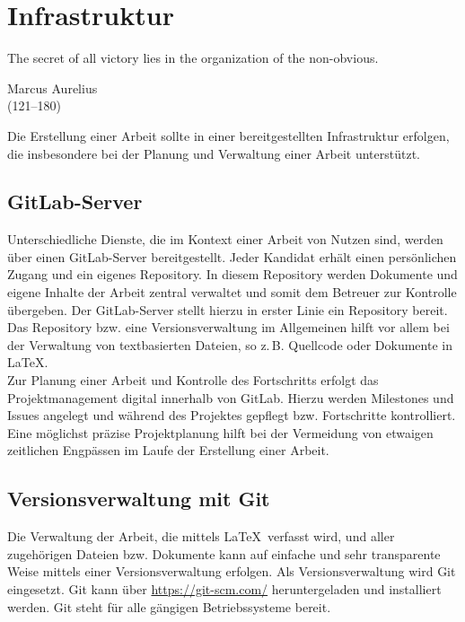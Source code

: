 \chapter{Infrastruktur}
\label{chap:infrastruktur}

\epigraph{\glqq The secret of all victory lies in the organization of the non-obvious.\grqq\bigskip}%
{{Marcus Aurelius}\\ (121--180)}

\noindent
Die Erstellung einer Arbeit sollte in einer bereitgestellten Infrastruktur erfolgen, die insbesondere bei der Planung und Verwaltung einer Arbeit unterstützt.
\indent

\section{GitLab-Server}

Unterschiedliche Dienste, die im Kontext einer Arbeit von Nutzen sind, werden über einen GitLab-Server bereitgestellt. Jeder Kandidat erhält einen persönlichen Zugang und ein eigenes Repository. In diesem Repository werden Dokumente und eigene Inhalte der Arbeit zentral verwaltet und somit dem Betreuer zur Kontrolle übergeben. Der GitLab-Server stellt hierzu in erster Linie ein Repository bereit. Das Repository bzw. eine Versionsverwaltung im Allgemeinen hilft vor allem bei der Verwaltung von textbasierten Dateien, so z.\,B. Quellcode oder Dokumente in \LaTeX .\\

Zur Planung einer Arbeit und Kontrolle des Fortschritts erfolgt das Projektmanagement digital innerhalb von GitLab. Hierzu werden Milestones und Issues angelegt und während des Projektes gepflegt bzw. Fortschritte kontrolliert. Eine möglichst präzise Projektplanung hilft bei der Vermeidung von etwaigen zeitlichen Engpässen im Laufe der Erstellung einer Arbeit.

\section{Versionsverwaltung mit Git}

Die Verwaltung der Arbeit, die mittels \LaTeX\ verfasst wird, und aller zugehörigen Dateien bzw. Dokumente kann auf einfache und sehr transparente Weise mittels einer Versionsverwaltung erfolgen. Als Versionsverwaltung wird Git eingesetzt. Git kann über \url{https://git-scm.com/} heruntergeladen und installiert werden. Git steht für alle gängigen Betriebssysteme bereit.\\

